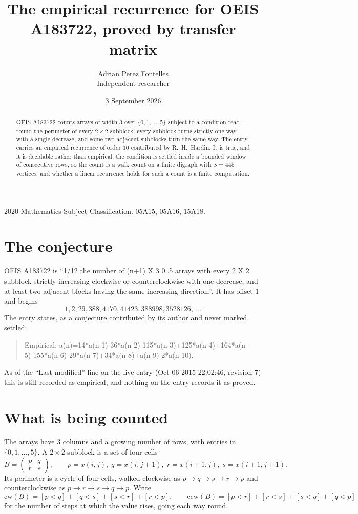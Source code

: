 \documentclass[11pt,a4paper]{article}
\title{The empirical recurrence for OEIS A183722, proved by transfer matrix}
\author{Adrian Perez Fontelles\\ \small Independent researcher}
\date{3 September 2026}
\theoremstyle{plain}
\theoremstyle{definition}
\begin{document}
\maketitle

\begin{abstract}
OEIS A183722 counts arrays of width $3$ over $\{0,1,\dots,5\}$ subject to a condition read round the
perimeter of every $2\times2$ subblock: every subblock turns strictly one way with a single decrease, and some two adjacent subblocks turn the same way. The entry carries an empirical recurrence of
order $10$ contributed by R.~H.~Hardin. It is true, and it is decidable rather than
empirical: the condition is settled inside a bounded window of consecutive rows, so the
count is a walk count on a finite digraph with $S=445$ vertices, and whether a linear
recurrence holds for such a count is a finite computation.
\end{abstract}

\noindent\small 2020 Mathematics Subject Classification. 05A15, 05A16, 15A18.\normalsize

\section{The conjecture}

OEIS A183722 is ``1/12 the number of (n+1) X 3 0..5 arrays with every 2 X 2 subblock strictly increasing clockwise or counterclockwise with one decrease, and at least two adjacent blocks having the same increasing direction.''. It has offset $1$ and begins
\[
1, 2, 29, 388, 4170, 41423, 388998, 3528126,\ \dots
\]
The entry states, as a conjecture contributed by its author and never marked settled:
\begin{quote}
Empirical: a(n)=14*a(n-1)-36*a(n-2)-115*a(n-3)+125*a(n-4)+164*a(n-5)-155*a(n-6)-29*a(n-7)+34*a(n-8)+a(n-9)-2*a(n-10).
\end{quote}
As of the ``Last modified'' line on the live entry (Oct 06 2015 22:02:46, revision 7) this is still
recorded as empirical, and nothing on the entry records it as proved.

\section{What is being counted}

The arrays have $3$ columns and a growing number of rows, with entries in $\{0,1,\dots,5\}$. A
$2\times2$ subblock is a set of four cells
\[
B=\begin{pmatrix} p & q \\ r & s \end{pmatrix},
\qquad p=x(i,j),\; q=x(i,j+1),\; r=x(i+1,j),\; s=x(i+1,j+1).
\]
Its perimeter is a cycle of four cells, walked clockwise as $p\to q\to s\to r\to p$ and
counterclockwise as $p\to r\to s\to q\to p$. Write
\[
\mathrm{cw}(B)=[p<q]+[q<s]+[s<r]+[r<p],\qquad
\mathrm{ccw}(B)=[p<r]+[r<s]+[s<q]+[q<p]
\]
for the number of steps at which the value rises, going each way round.
\end{document}
